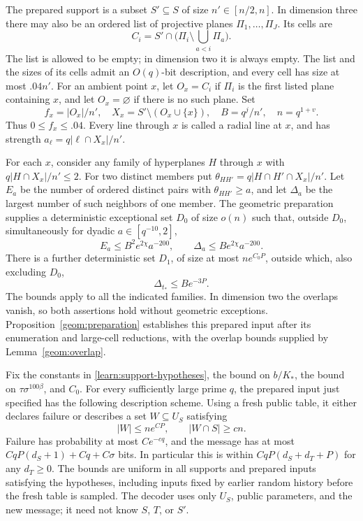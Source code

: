 The prepared support is a subset $S'\subseteq S$ of size
$n'\in[n/2,n]$. In dimension three there may also be an ordered list
of projective planes $\Pi_1,\ldots,\Pi_J$. Its cells are
\[
 C_i=S'\cap\bigl(\Pi_i\setminus\textstyle\bigcup_{a<i}\Pi_a\bigr).
\]
The list is allowed to be empty; in dimension two it is always empty.
The list and the sizes of its cells admit an $O(q)$-bit description, and
every cell has size at most $.04n'$. For an ambient point $x$, let
$O_x=C_i$ if $\Pi_i$ is the first listed plane containing $x$, and let
$O_x=\varnothing$ if there is no such plane. Set
\begin{equation}\label{learn:radial-definitions}
 f_x=|O_x|/n',\quad X_x=S'\setminus(O_x\cup\{x\}),\quad
 B=q^j/n',\quad n=q^{1+v}.
\end{equation}
Thus $0\le f_x\le .04$. Every line through $x$ is called a radial
line at $x$, and has strength
$a_\ell=q|\ell\cap X_x|/n'$.

For each $x$, consider any family of hyperplanes $H$ through $x$ with
$q|H\cap X_x|/n'\le2$. For two distinct members put
$\theta_{HH'}=q|H\cap H'\cap X_x|/n'$. Let $E_a$ be the number of
ordered distinct pairs with $\theta_{HH'}\ge a$, and let $\Delta_a$
be the largest number of such neighbors of one member. The geometric
preparation supplies a deterministic exceptional set $D_0$ of size
$o(n)$ such that, outside $D_0$, simultaneously for dyadic
$a\in[q^{-10},2]$,
\begin{equation}\label{learn:overlap-input}
 E_a\le B^2e^{2\chi}a^{-200},\qquad
 \Delta_a\le Be^{2\chi}a^{-200}.
\end{equation}
There is a further deterministic set $D_1$, of size at most
$n e^{C_0P}$, outside which, also excluding $D_0$,
\begin{equation}\label{learn:strong-degree-input}
 \Delta_{t_*}\le Be^{-3P}.
\end{equation}
The bounds apply to all the indicated families. In dimension two the
overlaps vanish, so both assertions hold without geometric exceptions.
Proposition~\ref{geom:preparation} establishes this prepared input after its
enumeration and large-cell reductions, with the overlap bounds supplied
by Lemma~\ref{geom:overlap}.

\begin{proposition}\label{learn:short-row}
Fix the constants in \eqref{learn:support-hypotheses}, the bound on
$b/K_*$, the bound on $\tau\sigma^{100\beta}$, and $C_0$.
For every sufficiently large prime $q$, the prepared input just
specified has the following description scheme. Using a fresh public
table, it either declares failure or describes a set $W\subseteq U_S$
satisfying
\[
 |W|\le n e^{CP},\qquad |W\cap S|\ge c n.
\]
Failure has probability at most $C e^{-cq}$, and the message has at most
$CqP(d_S+1)+Cq+C\sigma$ bits. In particular this is within
$CqP(d_S+d_T+P)$ for any $d_T\ge0$.
The bounds are uniform in all supports and prepared inputs satisfying
the hypotheses, including inputs fixed by earlier random history before
the fresh table is sampled. The decoder uses only $U_S$, public
parameters, and the new message; it need not know $S$, $T$, or $S'$.
\end{proposition}

